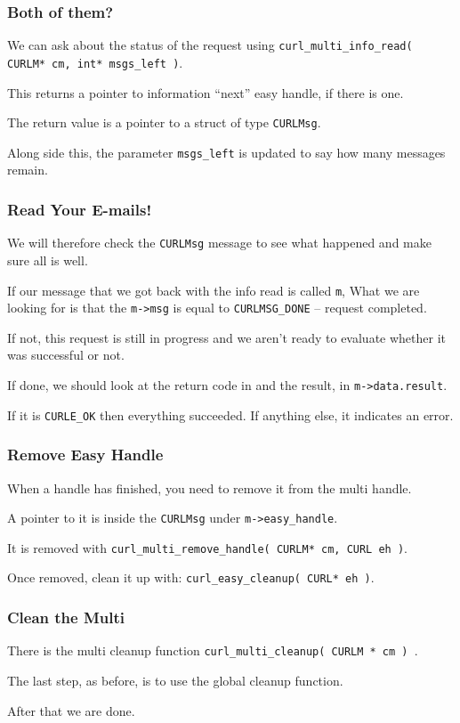 \begin{frame}
\frametitle{Both of them?}
We can ask about the status of the request using \texttt{curl\_multi\_info\_read( CURLM* cm, int* msgs\_left )}.

This returns a pointer to information ``next'' easy handle, if there is one.

The return value is a pointer to a struct of type \texttt{CURLMsg}.

Along side this, the parameter \texttt{msgs\_left} is updated to say how many messages remain.

\end{frame}

\begin{frame}
\frametitle{Read Your E-mails!}

We will therefore check the \texttt{CURLMsg} message to see what happened and make sure all is well. 

If our message that we got back with the info read is called \texttt{m}, What we are looking for is that the \texttt{m->msg} is equal to \texttt{CURLMSG\_DONE} -- request completed. 

If not, this request is still in progress and we aren't ready to evaluate whether it was successful or not.  

If done, we should look at the return code in and the result, in \texttt{m->data.result}. 

If it is \texttt{CURLE\_OK} then everything succeeded. If anything else, it indicates an error.


\end{frame}

\begin{frame}
\frametitle{Remove Easy Handle}

When a handle has finished, you need to remove it from the multi handle. 

A pointer to it is inside the \texttt{CURLMsg} under \texttt{m->easy\_handle}. 

It is removed with \texttt{curl\_multi\_remove\_handle( CURLM* cm, CURL eh )}. 

Once removed, clean it up with: \texttt{curl\_easy\_cleanup( CURL* eh )}.


\end{frame}

\begin{frame}
\frametitle{Clean the Multi}

There is the multi cleanup function \texttt{curl\_multi\_cleanup( CURLM * cm ) }.

The last step, as before, is to use the global cleanup function. 

After that we are done. 


\end{frame}


